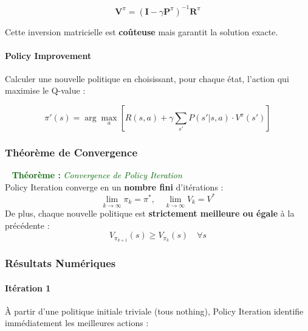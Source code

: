 \documentclass[11pt,a4paper]{article}
\newenvironment{thmbox}[1]{%
  \vspace{3pt}\begin{framed}
  \noindent{\color{DarkGreen}\rule{0.3cm}{3pt}}~%
  \textcolor{DarkGreen}{\textbf{Théorème :} \textit{#1}}\\[3pt]}
  {\end{framed}\vspace{3pt}}
\newcommand{\mat}[1]{\mathbf{#1}}
\begin{document}
\[
  \boxed{\mat{V}^\pi = (\mat{I} - \gamma \mat{P}^\pi)^{-1} \mat{R}^\pi}
\]
 
Cette inversion matricielle est \textbf{coûteuse} mais garantit la solution exacte.
 
\paragraph{Policy Improvement}
 
Calculer une nouvelle politique en choisissant, pour chaque état, l'action
qui maximise le Q-value :
 
\[
  \boxed{\pi'(s) = \arg\max_a \left[R(s,a) + \gamma \sum_{s'} P(s'|s,a) \cdot V^\pi(s')\right]}
\]
 
\subsubsection{Théorème de Convergence}
 
\begin{thmbox}{Convergence de Policy Iteration}
Policy Iteration converge en un \textbf{nombre fini} d'itérations :
\[
  \lim_{k \to \infty} \pi_k = \pi^*, \quad
  \lim_{k \to \infty} V_k = V^*
\]
De plus, chaque nouvelle politique est \textbf{strictement meilleure ou égale} à la précédente :
\[
  V_{\pi_{k+1}}(s) \geq V_{\pi_k}(s) \quad \forall s
\]
\end{thmbox}
 



 
\subsubsection{Résultats Numériques}
 
\paragraph{Itération 1}
 
À partir d'une politique initiale triviale (tous nothing), Policy Iteration
identifie immédiatement les meilleures actions :
 
\end{document}
